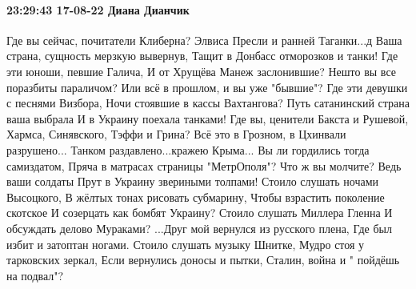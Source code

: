  
 
 
 
 

\paragraph{23:29:43 17-08-22 Диана Дианчик}

\obeycr
Где вы сейчас, почитатели Клиберна?
Элвиса Пресли и ранней Таганки...д
Ваша страна, сущность мерзкую вывернув,
Тащит в Донбасс отморозков и танки!
Где эти юноши, певшие Галича,
И от Хрущёва Манеж заслонившие?
Нешто вы все поразбиты параличом?
Или всё в прошлом, и вы уже "бывшие"?
Где эти девушки с песнями Визбора,
Ночи стоявшие в кассы Вахтангова?
Путь сатанинский страна ваша выбрала
И в Украину поехала танками!
Где вы, ценители Бакста и Рушевой,
Хармса, Синявского, Тэффи и Грина?
Всё это в Грозном, в Цхинвали разрушено...
Танком раздавлено...кражею Крыма...
Вы ли гордились тогда самиздатом,
Пряча в матрасах страницы "МетрОполя"?
Что ж вы молчите? Ведь ваши солдаты
Прут в Украину звериными толпами!
Стоило слушать ночами Высоцкого,
В жёлтых тонах рисовать субмарину,
Чтобы взрастить поколение скотское
И созерцать как бомбят Украину?
Стоило слушать Миллера Гленна
И обсуждать делово Мураками?
...Друг мой вернулся из русского плена,
Где был избит и затоптан ногами.
Стоило слушать музыку Шнитке,
Мудро стоя у тарковских зеркал,
Если вернулись доносы и пытки,
Сталин, война и " пойдёшь на подвал"?
\restorecr
